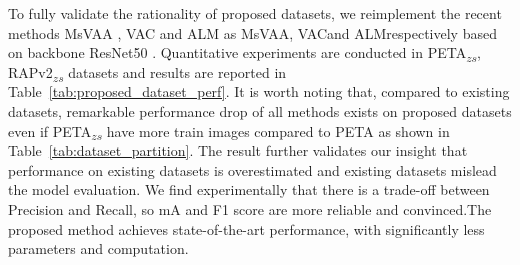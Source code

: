 \documentclass[runningheads]{llncs}
\begin{document}
 To fully validate the rationality of proposed datasets, we reimplement the recent methods MsVAA \cite{sarafianos2018deep}, VAC \cite{guo2019visual} and ALM \cite{tang2019Improving} as MsVAA\footnotemark[1], VAC\footnotemark[1] and ALM\footnotemark[1] respectively based on backbone ResNet50 \cite{he2016deep} . Quantitative experiments are conducted in PETA\textsubscript{$zs$}, RAPv2\textsubscript{$zs$} datasets and results are reported in Table~\ref{tab:proposed_dataset_perf}. 
It is worth noting that, compared to existing datasets, remarkable performance drop of all methods exists on proposed datasets even if PETA\textsubscript{$zs$} have more train images compared to PETA as shown in Table~\ref{tab:dataset_partition}. The result further validates our insight that performance on existing datasets is overestimated and existing datasets mislead the model evaluation. We find experimentally that there is a trade-off between Precision and Recall, so mA and F1 score are more reliable and convinced.The proposed method achieves state-of-the-art performance, with significantly less parameters and computation.
\end{document}
